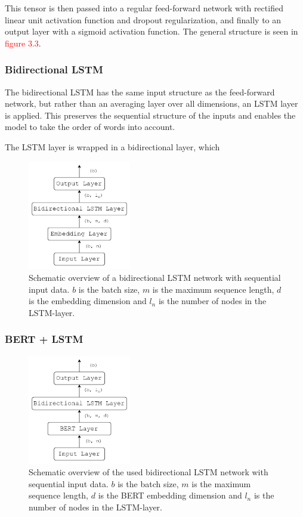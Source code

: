 This tensor is then passed into a regular feed-forward network with rectified linear unit activation function and dropout regularization, and finally to an output layer with a sigmoid activation function. The general structure is seen in \textcolor{red}{figure 3.3}. 

\subsubsection*{Bidirectional LSTM}

The bidirectional LSTM has the same input structure as the feed-forward network, but rather than an averaging layer over all dimensions, an LSTM layer is applied. This preserves the sequential structure of the inputs and enables the model to take the order of words into account. 

The LSTM layer is wrapped in a bidirectional layer, which 

\begin{figure}[H]
    \centering
    \includegraphics[width=0.4\textwidth]{Figures/figs-bidir-lstm.pdf}
    \caption{Schematic overview of a bidirectional LSTM network with sequential input data. $b$ is the batch size, $m$ is the maximum sequence length, $d$ is the embedding dimension and $l_n$ is the number of nodes in the LSTM-layer.}
\end{figure}

\subsubsection*{BERT + LSTM}



\begin{figure}[H]
    \centering
    \includegraphics[width=0.4\textwidth]{Figures/figs-bert-lstm.pdf}
    \caption{Schematic overview of the used bidirectional LSTM network with sequential input data. $b$ is the batch size, $m$ is the maximum sequence length, $d$ is the BERT embedding dimension and $l_n$ is the number of nodes in the LSTM-layer.}
\end{figure}


